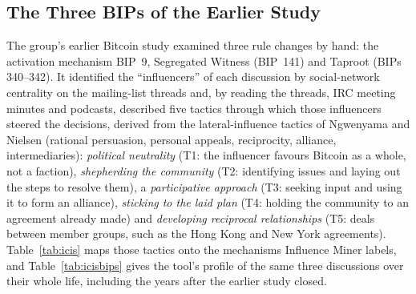 \subsection{The Three BIPs of the Earlier Study}
\label{sec:icis}

The group's earlier Bitcoin study \cite{thapa2021bitcoin} examined three rule changes by hand: the activation mechanism BIP~9, Segregated Witness (BIP~141) and Taproot (BIPs 340--342). It identified the ``influencers'' of each discussion by social-network centrality on the mailing-list threads and, by reading the threads, IRC meeting minutes and podcasts, described five tactics through which those influencers steered the decisions, derived from the lateral-influence tactics of Ngwenyama and Nielsen \cite{ngwenyama2014} (rational persuasion, personal appeals, reciprocity, alliance, intermediaries): \emph{political neutrality} (T1: the influencer favours Bitcoin as a whole, not a faction), \emph{shepherding the community} (T2: identifying issues and laying out the steps to resolve them), a \emph{participative approach} (T3: seeking input and using it to form an alliance), \emph{sticking to the laid plan} (T4: holding the community to an agreement already made) and \emph{developing reciprocal relationships} (T5: deals between member groups, such as the Hong Kong and New York agreements). Table~\ref{tab:icis} maps those tactics onto the mechanisms Influence Miner labels, and Table~\ref{tab:icisbips} gives the tool's profile of the same three discussions over their whole life, including the years after the earlier study closed.

